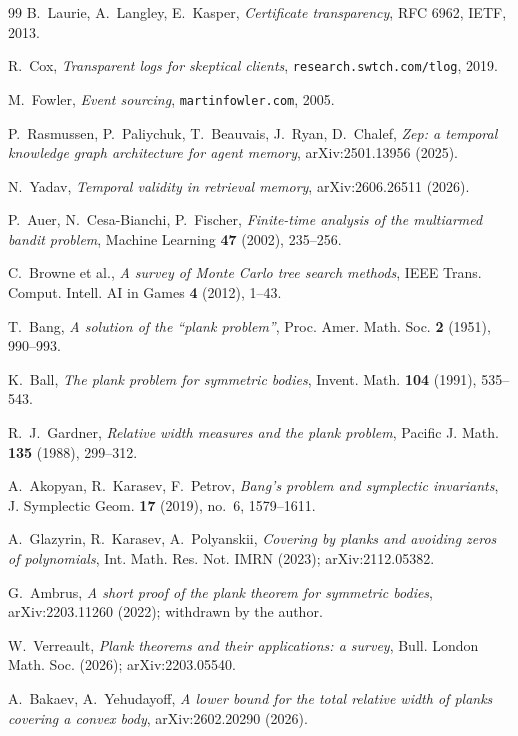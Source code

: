 \documentclass[11pt]{amsart}
\theoremstyle{definition}
\theoremstyle{remark}
\begin{document}
\begin{thebibliography}{99}
 B.~Laurie, A.~Langley, E.~Kasper, \emph{Certificate
transparency}, RFC 6962, IETF, 2013.

 R.~Cox, \emph{Transparent logs for skeptical clients},
\texttt{research.swtch.com/tlog}, 2019.

 M.~Fowler, \emph{Event sourcing}, \texttt{martinfowler.com},
2005.

 P.~Rasmussen, P.~Paliychuk, T.~Beauvais, J.~Ryan, D.~Chalef,
\emph{Zep: a temporal knowledge graph architecture for agent memory},
arXiv:2501.13956 (2025).

 N.~Yadav, \emph{Temporal validity in retrieval memory},
arXiv:2606.26511 (2026).

 P.~Auer, N.~Cesa-Bianchi, P.~Fischer, \emph{Finite-time
analysis of the multiarmed bandit problem}, Machine Learning \textbf{47} (2002),
235--256.

 C.~Browne et al., \emph{A survey of Monte Carlo tree search
methods}, IEEE Trans. Comput. Intell. AI in Games \textbf{4} (2012), 1--43.

 T.~Bang, \emph{A solution of the ``plank problem''}, Proc.
Amer. Math. Soc. \textbf{2} (1951), 990--993.

 K.~Ball, \emph{The plank problem for symmetric bodies}, Invent.
Math. \textbf{104} (1991), 535--543.

 R.~J.~Gardner, \emph{Relative width measures and the plank
problem}, Pacific J. Math. \textbf{135} (1988), 299--312.

 A.~Akopyan, R.~Karasev, F.~Petrov, \emph{Bang's problem and
symplectic invariants}, J. Symplectic Geom. \textbf{17} (2019), no.~6,
1579--1611.

 A.~Glazyrin, R.~Karasev, A.~Polyanskii, \emph{Covering by planks
and avoiding zeros of polynomials}, Int. Math. Res. Not. IMRN (2023);
arXiv:2112.05382.

 G.~Ambrus, \emph{A short proof of the plank theorem for
symmetric bodies}, arXiv:2203.11260 (2022); withdrawn by the author.

 W.~Verreault, \emph{Plank theorems and their applications:
a survey}, Bull. London Math. Soc. (2026); arXiv:2203.05540.

 A.~Bakaev, A.~Yehudayoff, \emph{A lower bound for the total
relative width of planks covering a convex body}, arXiv:2602.20290 (2026).


\end{thebibliography}
\end{document}
